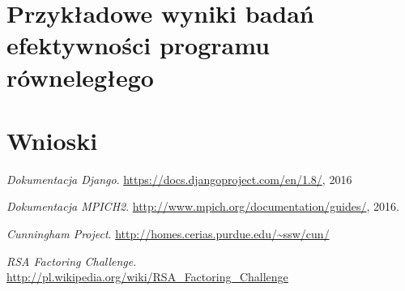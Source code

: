 \documentclass{article}
\begin{document}
\section{Przykładowe wyniki badań efektywności programu równeległego}

\section{Wnioski}

\newpage
\begin{thebibliography}{9}
	\emph{Dokumentacja Django}.
	\url{https://docs.djangoproject.com/en/1.8/},
	2016

	\emph{Dokumentacja MPICH2}.
  	\url{http://www.mpich.org/documentation/guides/},
  	2016.

	\emph{Cunningham Project}.
	\url{http://homes.cerias.purdue.edu/~ssw/cun/}

	\emph{RSA Factoring Challenge}.
	\url{http://pl.wikipedia.org/wiki/RSA_Factoring_Challenge}

\end{thebibliography}
\end{document}
